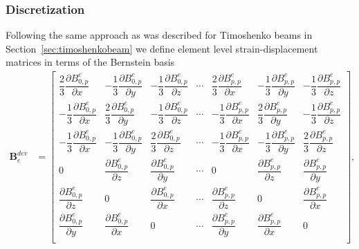 \subsubsection{Discretization}
Following the same approach as was described for Timoshenko beams in Section~\ref{sec:timoshenkobeam} we define element level strain-displacement matrices in terms of the Bernstein basis
\begin{align}
    {\mathbf{B}^{dev}_e} & =
    \begin{bmatrix}
        \dfrac{2}{3}\dfrac{\partial{B}^e_{0,p}}{\partial{x}}  & -\dfrac{1}{3}\dfrac{\partial{B}^e_{0,p}}{\partial{y}} & -\dfrac{1}{3}\dfrac{\partial{B}^e_{0,p}}{\partial{z}} & \cdots & \dfrac{2}{3}\dfrac{\partial{B}^e_{p,p}}{\partial{x}}  & -\dfrac{1}{3}\dfrac{\partial{B}^e_{p,p}}{\partial{y}} & -\dfrac{1}{3}\dfrac{\partial{B}^e_{p,p}}{\partial{z}} \\
        -\dfrac{1}{3}\dfrac{\partial{B}^e_{0,p}}{\partial{x}} & \dfrac{2}{3}\dfrac{\partial{B}^e_{0,p}}{\partial{y}}  & -\dfrac{1}{3}\dfrac{\partial{B}^e_{0,p}}{\partial{z}} & \cdots & -\dfrac{1}{3}\dfrac{\partial{B}^e_{p,p}}{\partial{x}} & \dfrac{2}{3}\dfrac{\partial{B}^e_{p,p}}{\partial{y}}  & -\dfrac{1}{3}\dfrac{\partial{B}^e_{p,p}}{\partial{z}} \\
        -\dfrac{1}{3}\dfrac{\partial{B}^e_{0,p}}{\partial{x}} & -\dfrac{1}{3}\dfrac{\partial{B}^e_{0,p}}{\partial{y}} & \dfrac{2}{3}\dfrac{\partial{B}^e_{0,p}}{\partial{z}}  & \cdots & -\dfrac{1}{3}\dfrac{\partial{B}^e_{p,p}}{\partial{x}} & -\dfrac{1}{3}\dfrac{\partial{B}^e_{p,p}}{\partial{y}} & \dfrac{2}{3}\dfrac{\partial{B}^e_{p,p}}{\partial{z}}  \\
        0                                                     & \dfrac{\partial{B}^e_{0,p}}{\partial{z}}              & \dfrac{\partial{B}^e_{0,p}}{\partial{y}}              & \cdots & 0                                                     & \dfrac{\partial{B}^e_{p,p}}{\partial{z}}              & \dfrac{\partial{B}^e_{p,p}}{\partial{y}}              \\
        \dfrac{\partial{B}^e_{0,p}}{\partial{z}}              & 0                                                     & \dfrac{\partial{B}^e_{0,p}}{\partial{x}}              & \cdots & \dfrac{\partial{B}^e_{p,p}}{\partial{z}}              & 0                                                     & \dfrac{\partial{B}^e_{p,p}}{\partial{x}}              \\
        \dfrac{\partial{B}^e_{0,p}}{\partial{y}}              & \dfrac{\partial{B}^e_{0,p}}{\partial{x}}              & 0                                                     & \cdots & \dfrac{\partial{B}^e_{p,p}}{\partial{y}}              & \dfrac{\partial{B}^e_{p,p}}{\partial{x}}              & 0                                                     \\
    \end{bmatrix},
\end{align}
